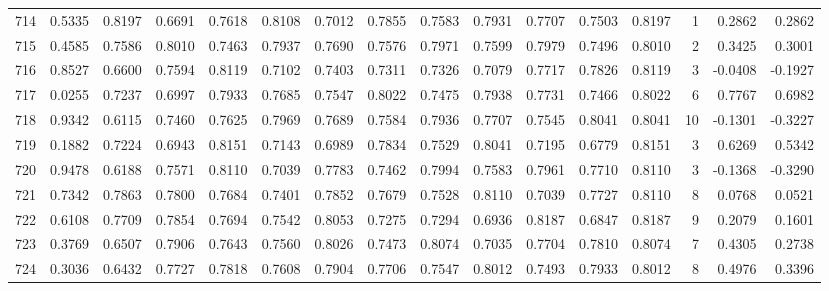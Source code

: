 \begin{tabular}{lrrrrrrrrrrrrrrr}
714 &      0.5335 &  0.8197 &  0.6691 &  0.7618 &  0.8108 &  0.7012 &  0.7855 &  0.7583 &  0.7931 &  0.7707 &   0.7503 &     0.8197 &      1 &                    0.2862 &                     0.2862 \\
715 &      0.4585 &  0.7586 &  0.8010 &  0.7463 &  0.7937 &  0.7690 &  0.7576 &  0.7971 &  0.7599 &  0.7979 &   0.7496 &     0.8010 &      2 &                    0.3425 &                     0.3001 \\
716 &      0.8527 &  0.6600 &  0.7594 &  0.8119 &  0.7102 &  0.7403 &  0.7311 &  0.7326 &  0.7079 &  0.7717 &   0.7826 &     0.8119 &      3 &                   -0.0408 &                    -0.1927 \\
717 &      0.0255 &  0.7237 &  0.6997 &  0.7933 &  0.7685 &  0.7547 &  0.8022 &  0.7475 &  0.7938 &  0.7731 &   0.7466 &     0.8022 &      6 &                    0.7767 &                     0.6982 \\
718 &      0.9342 &  0.6115 &  0.7460 &  0.7625 &  0.7969 &  0.7689 &  0.7584 &  0.7936 &  0.7707 &  0.7545 &   0.8041 &     0.8041 &     10 &                   -0.1301 &                    -0.3227 \\
719 &      0.1882 &  0.7224 &  0.6943 &  0.8151 &  0.7143 &  0.6989 &  0.7834 &  0.7529 &  0.8041 &  0.7195 &   0.6779 &     0.8151 &      3 &                    0.6269 &                     0.5342 \\
720 &      0.9478 &  0.6188 &  0.7571 &  0.8110 &  0.7039 &  0.7783 &  0.7462 &  0.7994 &  0.7583 &  0.7961 &   0.7710 &     0.8110 &      3 &                   -0.1368 &                    -0.3290 \\
721 &      0.7342 &  0.7863 &  0.7800 &  0.7684 &  0.7401 &  0.7852 &  0.7679 &  0.7528 &  0.8110 &  0.7039 &   0.7727 &     0.8110 &      8 &                    0.0768 &                     0.0521 \\
722 &      0.6108 &  0.7709 &  0.7854 &  0.7694 &  0.7542 &  0.8053 &  0.7275 &  0.7294 &  0.6936 &  0.8187 &   0.6847 &     0.8187 &      9 &                    0.2079 &                     0.1601 \\
723 &      0.3769 &  0.6507 &  0.7906 &  0.7643 &  0.7560 &  0.8026 &  0.7473 &  0.8074 &  0.7035 &  0.7704 &   0.7810 &     0.8074 &      7 &                    0.4305 &                     0.2738 \\
724 &      0.3036 &  0.6432 &  0.7727 &  0.7818 &  0.7608 &  0.7904 &  0.7706 &  0.7547 &  0.8012 &  0.7493 &   0.7933 &     0.8012 &      8 &                    0.4976 &                     0.3396 \\

\end{tabular}
